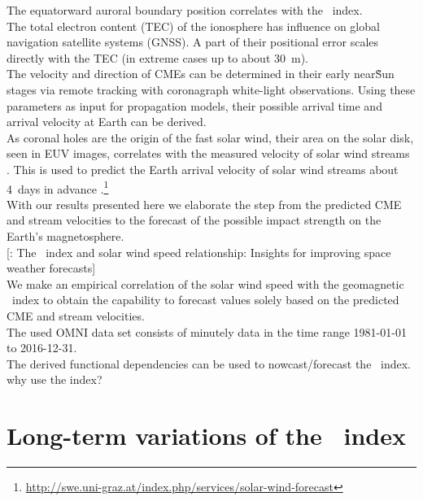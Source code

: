 The equatorward auroral boundary position correlates with the \Kp~index.\\

The total electron content (TEC) of the ionosphere has influence on global navigation satellite systems (GNSS). A part of their positional error scales directly with the TEC (in extreme cases up to about \SI{30}{\m}).\\

The velocity and direction of CMEs can be determined in their early near\~Sun stages via remote tracking with coronagraph white-light observations. Using these parameters as input for propagation models, their possible arrival time and arrival velocity at Earth can be derived.\\

As coronal holes are the origin of the fast solar wind, their area on the solar disk, seen in EUV images, correlates with the measured velocity of solar wind streams \citep{Vrsnak2007}. This is used to predict the Earth arrival velocity of solar wind streams about 4~days in advance \citep{Rotter2012}.\footnote{\url{http://swe.uni-graz.at/index.php/services/solar-wind-forecast}}\\

With our results presented here we elaborate the step from the predicted CME and stream velocities to the forecast of the possible impact strength on the Earth's magnetosphere.\\

[\citet{Elliott2013}: The \Kp~index and solar wind speed relationship: Insights for improving space weather forecasts]\\

We make an empirical correlation of the solar wind speed with the geomagnetic \Kp~index to obtain the capability to forecast \Kp{} values solely based on the predicted CME and stream velocities.\\

The used OMNI data set consists of minutely data in the time range 1981-01-01 to 2016-12-31.\\

The derived functional dependencies can be used to nowcast/forecast the \Kp~index.\\


why use the \Kp{} index?\\


\section{Long-term variations of the \Kp{}~index}

